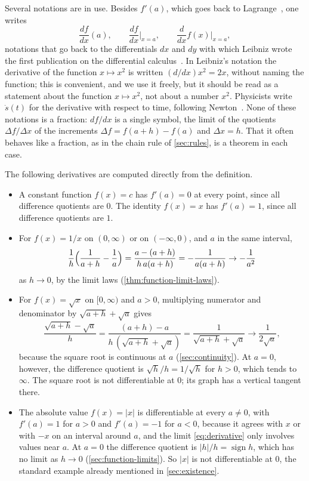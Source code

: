 Several notations are in use. Besides $f'(a)$, which goes back to Lagrange~\cite{lagrange1797}, one writes
\[
\frac{df}{dx}(a),\qquad\frac{df}{dx}\Big|_{x=a},\qquad\frac{d}{dx}f(x)\Big|_{x=a},
\]
notations that go back to the differentials $dx$ and $dy$ with which Leibniz wrote the first publication on the differential calculus~\cite{leibniz1684,edwards1979}. In Leibniz's notation the derivative of the function $x\mapsto x^2$ is written $(d/dx)x^2=2x$, without naming the function; this is convenient, and we use it freely, but it should be read as a statement about the function $x\mapsto x^2$, not about a number $x^2$. Physicists write $\dot s(t)$ for the derivative with respect to time, following Newton~\cite{edwards1979}. None of these notations is a fraction: $df/dx$ is a single symbol, the limit of the quotients $\Delta f/\Delta x$ of the increments $\Delta f=f(a+h)-f(a)$ and $\Delta x=h$. That it often behaves like a fraction, as in the chain rule of \cref{sec:rules}, is a theorem in each case.

The following derivatives are computed directly from the definition.
\begin{itemize}
\item A constant function $f(x)=c$ has $f'(a)=0$ at every point, since all difference quotients are $0$. The identity $f(x)=x$ has $f'(a)=1$, since all difference quotients are $1$.
\item For $f(x)=1/x$ on $(0,\infty)$ or on $(-\infty,0)$, and $a$ in the same interval,
\[
\frac1h\Bigl(\frac1{a+h}-\frac1a\Bigr)=\frac{a-(a+h)}{h\,a(a+h)}=-\frac1{a(a+h)}\to-\frac1{a^2}
\]
as $h\to0$, by the limit laws (\cref{thm:function-limit-laws}).
\item For $f(x)=\sqrt x$ on $[0,\infty)$ and $a>0$, multiplying numerator and denominator by $\sqrt{a+h}+\sqrt a$ gives
\[
\frac{\sqrt{a+h}-\sqrt a}h=\frac{(a+h)-a}{h\,(\sqrt{a+h}+\sqrt a)}=\frac1{\sqrt{a+h}+\sqrt a}\to\frac1{2\sqrt a},
\]
because the square root is continuous at $a$ (\cref{sec:continuity}). At $a=0$, however, the difference quotient is $\sqrt h/h=1/\sqrt h$ for $h>0$, which tends to $\infty$. The square root is not differentiable at $0$; its graph has a vertical tangent there.
\item The absolute value $f(x)=|x|$ is differentiable at every $a\ne0$, with $f'(a)=1$ for $a>0$ and $f'(a)=-1$ for $a<0$, because it agrees with $x$ or with $-x$ on an interval around $a$, and the limit \eqref{eq:derivative} only involves values near $a$. At $a=0$ the difference quotient is $|h|/h=\operatorname{sign}h$, which has no limit as $h\to0$ (\cref{sec:function-limits}). So $|x|$ is not differentiable at $0$, the standard example already mentioned in \cref{sec:existence}.
\end{itemize}

